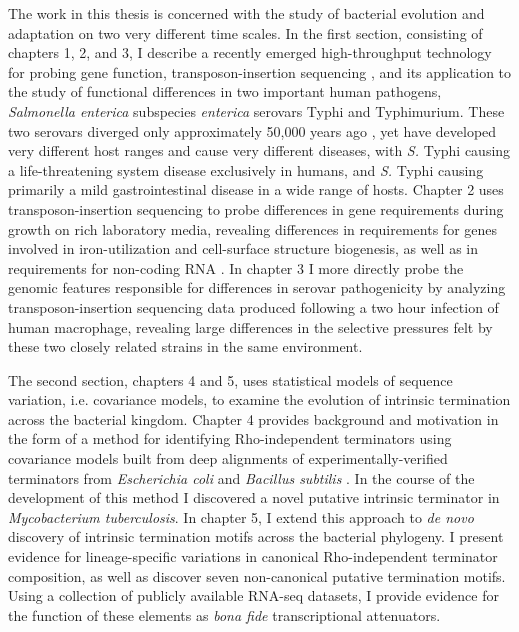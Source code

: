 The work in this thesis is concerned with the study of bacterial evolution and adaptation on two very different time scales. In the first section, consisting of chapters 1, 2, and 3, I describe a recently emerged high-throughput technology for probing gene function, transposon-insertion sequencing \parencite{Barquist2013}, and its application to the study of functional differences in two important human pathogens, \textit{Salmonella enterica} subspecies \textit{enterica} serovars Typhi and Typhimurium. These two serovars diverged only approximately 50,000 years ago \parencite{Kidgell2002}, yet have developed very different host ranges and cause very different diseases, with \textit{S.} Typhi causing a life-threatening system disease exclusively in humans, and \textit{S.} Typhi causing primarily a mild gastrointestinal disease in a wide range of hosts. Chapter 2 uses transposon-insertion sequencing to probe differences in gene requirements during growth on rich laboratory media, revealing differences in requirements for genes involved in iron-utilization and cell-surface structure biogenesis, as well as in requirements for non-coding RNA \parencite{Barquist2013a}. In chapter 3 I more directly probe the genomic features responsible for differences in serovar pathogenicity by analyzing transposon-insertion sequencing data produced following a two hour infection of human macrophage, revealing large differences in the selective pressures felt by these two closely related strains in the same environment.

The second section, chapters 4 and 5, uses statistical models of sequence variation, i.e. covariance models, to examine the evolution of intrinsic termination across the bacterial kingdom. Chapter 4 provides background and motivation in the form of a method for identifying Rho-independent terminators using covariance models built from deep alignments of experimentally-verified terminators from \textit{Escherichia coli} and \textit{Bacillus subtilis} \parencite{Gardner2011a}. In the course of the development of this method I discovered a novel putative intrinsic terminator in \textit{Mycobacterium tuberculosis}. In chapter 5, I extend this approach to \textit{de novo} discovery of intrinsic termination motifs across the bacterial phylogeny. I present evidence for lineage-specific variations in canonical Rho-independent terminator composition, as well as discover seven non-canonical putative termination motifs. Using a collection of publicly available RNA-seq datasets, I provide evidence for the function of these elements as \textit{bona fide} transcriptional attenuators.